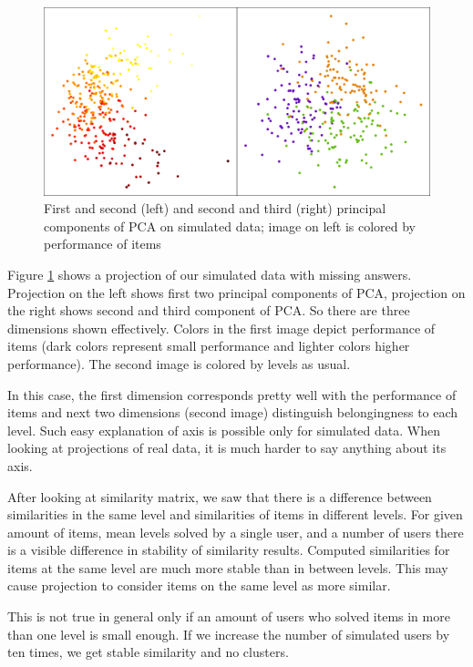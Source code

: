 \documentclass[
  digital, %
  table,   %
  nolof,     %
  nolot,     %
  nocover,
  color,
  final, %
]{fithesis3}
\begin{document}
\begin{figure}
  \includegraphics[width=\textwidth]{img/simulated_missing}
  \caption{First and second (left) and second and third (right) principal components of PCA on simulated data; image on left is colored by performance of items}
  \label{fig:simulated_missing}
\end{figure}

Figure \ref{fig:simulated_missing} shows a projection of our simulated data with missing answers. Projection on the left shows first two principal components of PCA, projection on the right shows second and third component of PCA. So there are three dimensions shown effectively. Colors in the first image depict performance of items (dark colors represent small performance and lighter colors higher performance). The second image is colored by levels as usual.

In this case, the first dimension corresponds pretty well with the performance of items and next two dimensions (second image) distinguish belongingness to each level. Such easy explanation of axis is possible only for simulated data. When looking at projections of real data, it is much harder to say anything about its axis.

After looking at similarity matrix, we saw that there is a difference between similarities in the same level and similarities of items in different levels. For given amount of items, mean levels solved by a single user, and a number of users there is a visible difference in stability of similarity results. Computed similarities for items at the same level are much more stable than in between levels. This may cause projection to consider items on the same level as more similar.

This is not true in general only if an amount of users who solved items in more than one level is small enough. If we increase the number of simulated users by ten times, we get stable similarity and no clusters.
\end{document}
